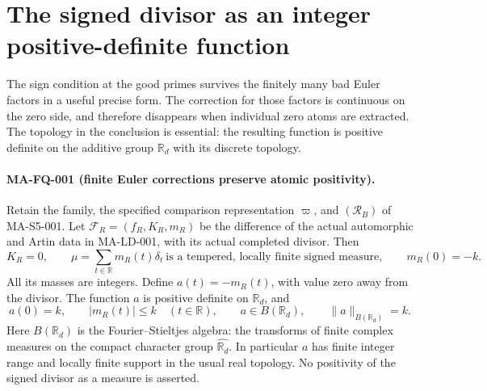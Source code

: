 \section{The signed divisor as an integer positive-definite function}
\label{sec:s5-crystal}

The sign condition at the good primes survives the finitely many bad
Euler factors in a useful precise form. The correction for those
factors is continuous on the zero side, and therefore disappears
when individual zero atoms are extracted. The topology in the
conclusion is essential: the resulting function is positive definite
on the additive group $\mathbb R_d$ with its discrete topology.

\paragraph{MA-FQ-001 (finite Euler corrections preserve atomic positivity).}
Retain the family, the specified comparison representation $\varpi$,
and $(\mathcal R_B)$ of MA-S5-001. Let
$\mathcal F_R=(f_R,K_R,m_R)$ be the difference of the actual
automorphic and Artin data in MA-LD-001, with its actual completed
divisor. Then
\[
 K_R=0,\qquad
 \mu=\sum_{t\in\mathbb R}m_R(t)\delta_t
       \ \text{is a tempered, locally finite signed measure},
 \qquad m_R(0)=-k.
 \tag{MA-FQ.1a}
\]
All its masses are integers. Define $a(t)=-m_R(t)$, with value zero
away from the divisor. The function $a$ is positive definite on
$\mathbb R_d$, and
\[
 a(0)=k,\qquad |m_R(t)|\le k\quad(t\in\mathbb R),\qquad
 a\in B(\mathbb R_d),\qquad \|a\|_{B(\mathbb R_d)}=k.
 \tag{MA-FQ.1b}
\]
Here $B(\mathbb R_d)$ is the Fourier--Stieltjes algebra: the
transforms of finite complex measures on the compact character
group $\widehat{\mathbb R_d}$. In particular $a$ has finite integer
range and locally finite support in the usual real topology.
No positivity of the signed divisor as a measure is asserted.

